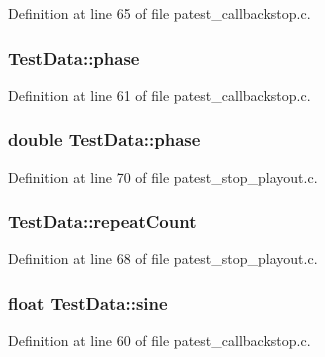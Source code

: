 Definition at line 65 of file patest\+\_\+callbackstop.\+c.

\subsubsection[{\texorpdfstring{phase}{phase}}]{ Test\+Data\+::phase}\hypertarget{struct_test_data_a676e23524d19ee0d0ab418ca2711f3fc}{}\label{struct_test_data_a676e23524d19ee0d0ab418ca2711f3fc}


Definition at line 61 of file patest\+\_\+callbackstop.\+c.

\subsubsection[{\texorpdfstring{phase}{phase}}]{\setlength{\rightskip}{0pt plus 5cm}double Test\+Data\+::phase}\hypertarget{struct_test_data_a8cd80e61ff8b13b9824abc6560a36e73}{}\label{struct_test_data_a8cd80e61ff8b13b9824abc6560a36e73}


Definition at line 70 of file patest\+\_\+stop\+\_\+playout.\+c.

\subsubsection[{\texorpdfstring{repeat\+Count}{repeatCount}}]{ Test\+Data\+::repeat\+Count}\hypertarget{struct_test_data_a635ef4394012dfaf9516c59488ea874d}{}\label{struct_test_data_a635ef4394012dfaf9516c59488ea874d}


Definition at line 68 of file patest\+\_\+stop\+\_\+playout.\+c.

\subsubsection[{\texorpdfstring{sine}{sine}}]{\setlength{\rightskip}{0pt plus 5cm}float Test\+Data\+::sine}\hypertarget{struct_test_data_a13af6d37ddd977277e3a151432f6ac8d}{}\label{struct_test_data_a13af6d37ddd977277e3a151432f6ac8d}


Definition at line 60 of file patest\+\_\+callbackstop.\+c.


